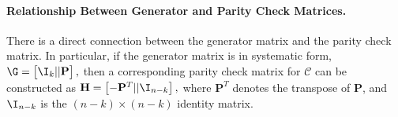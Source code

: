 \paragraph{Relationship Between Generator and Parity Check Matrices.}
There is a direct connection between the generator matrix and the parity check matrix. In particular, if the generator matrix is in systematic form, 
\(
\G = \begin{bmatrix} \I_k || \mathbf{P} \end{bmatrix},
\)
then a corresponding parity check matrix for $\mathcal{C}$ can be constructed as
\(
\mathbf{H} = \begin{bmatrix} -\mathbf{P}^T || \I_{n-k} \end{bmatrix},
\)
where $\mathbf{P}^T$ denotes the transpose of $\mathbf{P}$, and $\I_{n-k}$ is the $(n-k)\times (n-k)$ identity matrix.



